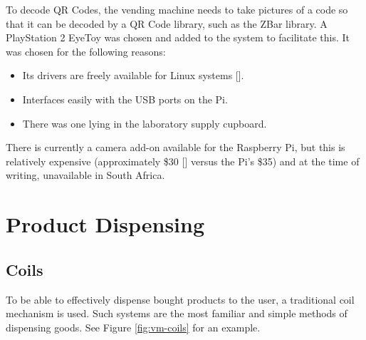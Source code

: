 To decode QR Codes, the vending machine needs to take pictures of a code so that it can be
decoded by a QR Code library, such as the ZBar library. A PlayStation 2 EyeToy was
chosen and added to the system to facilitate this. It was chosen for the following reasons:

\begin{itemize}
  \item Its drivers are freely available for Linux systems [\cite{website:webcam-drivers}].
  \item Interfaces easily with the USB ports on the Pi.
  \item There was one lying in the laboratory supply cupboard.
\end{itemize}

There is currently a camera add-on available for the Raspberry Pi, but this is relatively
expensive (approximately \$30 [\cite{website:raspi-camera}] versus the Pi's \$35) and at
the time of writing, unavailable in South Africa.

\section{Product Dispensing}

\subsection{Coils}

To be able to effectively dispense bought products to the user, a traditional coil mechanism is
used. Such systems are the most familiar and simple methods of dispensing goods. See Figure
\ref{fig:vm-coils} for an example.

